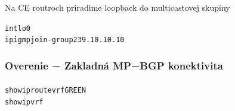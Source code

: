 \documentclass[12pt,twoside,a4paper]{report}
\begin{document}
Na CE routroch priradime loopback do multicastovej skupiny

\noindent
{\selectfont
\begin{small}
\begin{alltt}
int lo0
  ip igmp join-group 239.10.10.10
\end{alltt}
\end{small}
}





\subsubsection{Overenie − Zakladná MP−BGP konektivita}
\paragraph{}
\noindent
{\selectfont
\begin{small}
\begin{alltt}
show ip route vrf GREEN
show ip vrf
\end{alltt}
\end{small}
}
\end{document}
